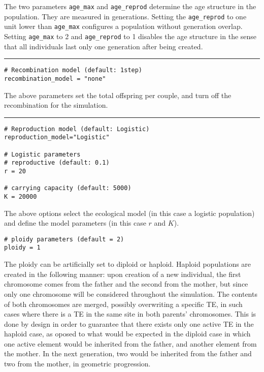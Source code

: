 \documentclass[10pt]{article}
\begin{document}
The two parameters \verb|age_max| and \verb|age_reprod| determine the
age structure in the population. They are measured in
generations. Setting the \verb|age_reprod| to one unit lower than
\verb|age_max| configures a population without generation
overlap. Setting \verb|age_max| to 2 and \verb|age_reprod| to 1
disables the age structure in the sense that all individuals
last only one generation after being created.

{\centering\noindent\rule{0.5\textwidth}{0.4pt}}

\begin{verbatim}
# Recombination model (default: 1step)
recombination_model = "none"
\end{verbatim}

The above parameters set the total offspring per couple, and turn off
the recombination for the simulation.

{\centering\noindent\rule{0.5\textwidth}{0.4pt}}

\begin{verbatim}
# Reproduction model (default: Logistic)
reproduction_model="Logistic"

# Logistic parameters
# reproductive (default: 0.1)
r = 20

# carrying capacity (default: 5000)
K = 20000
\end{verbatim}

The above options select the ecological model (in this case a logistic
population) and define the model parameters (in this case $r$ and
$K$).

\begin{verbatim}
# ploidy parameters (default = 2)
ploidy = 1
\end{verbatim}

The ploidy can be artificially set to diploid or haploid. Haploid
populations are created in the following manner: upon creation of a
new individual, the first chromosome comes from the father and the
second from the mother, but since only one chromosome will be
considered throughout the simulation. The contents of both chromosomes
are merged, possibly overwriting a specific TE, in such cases where
there is a TE in the same site in both parents' chromosomes. This is
done by design in order to guarantee that there exists only one active
TE in the haploid case, as oposed to what would be expected in the
diploid case in which one active element would be inherited from the
father, and another element from the mother. In the next generation,
two would be inherited from the father and two from the mother, in
geometric progression.
\end{document}
